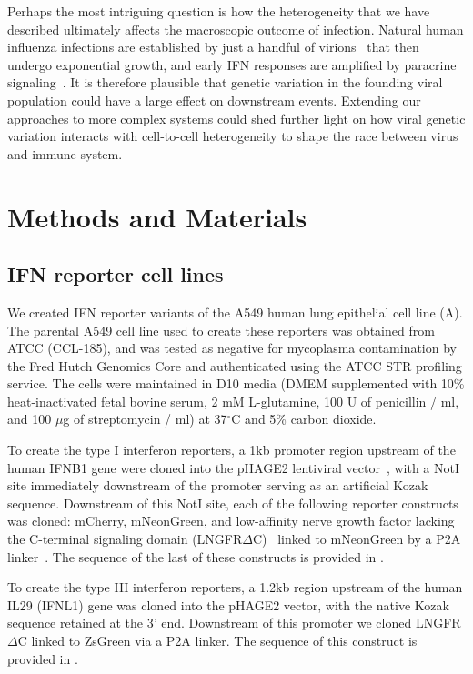 \documentclass[9pt,lineno]{template}
\begin{document}
Perhaps the most intriguing question is how the heterogeneity that we have described ultimately affects the macroscopic outcome of infection.
Natural human influenza infections are established by just a handful of virions~\citep{mccrone2018stochastic, xue2018reconciling, varble2014influenza} that then undergo exponential growth, and early IFN responses are amplified by paracrine signaling~\citep{stetson2006type,honda2006type}.
It is therefore plausible that genetic variation in the founding viral population could have a large effect on downstream events.
Extending our approaches to more complex systems could shed further light on how viral genetic variation interacts with cell-to-cell heterogeneity to shape the race between virus and immune system.

\clearpage


\section{Methods and Materials}

\subsection{IFN reporter cell lines}
We created IFN reporter variants of the A549 human lung epithelial cell line (A).
The parental A549 cell line used to create these reporters was obtained from ATCC (CCL-185), and was tested as negative for mycoplasma contamination by the Fred Hutch Genomics Core and authenticated using the ATCC STR profiling service.
The cells were maintained in D10 media (DMEM supplemented with 10\% heat-inactivated fetal bovine serum, 2 mM L-glutamine, 100 U of penicillin / ml, and 100 $\mu$g of streptomycin / ml) at 37$^{\circ}$C and 5\% carbon dioxide.

To create the type I interferon reporters, a 1kb promoter region upstream of the human IFNB1 gene were cloned into the pHAGE2 lentiviral vector~\citep{oconnell2010lentiviral}, with a NotI site immediately downstream of the promoter serving as an artificial Kozak sequence. 
Downstream of this NotI site, each of the following reporter constructs was cloned: mCherry, mNeonGreen, and low-affinity nerve growth factor lacking the C-terminal signaling domain (LNGFR$\Delta$C)~\citep{bonini1997hsv,ruggieri1997cell} linked to mNeonGreen by a P2A linker~\citep{kim2011high}.
The sequence of the last of these constructs is provided in .

To create the type III interferon reporters, a 1.2kb region upstream of the human IL29 (IFNL1) gene was cloned into the pHAGE2 vector, with the native Kozak sequence retained at the 3' end. 
Downstream of this promoter we cloned LNGFR$\Delta$C linked to ZsGreen via a P2A linker.
The sequence of this construct is provided in .
 
\end{document}
